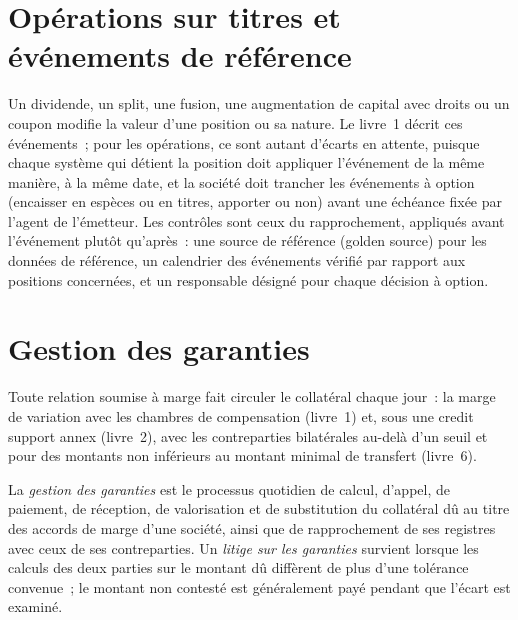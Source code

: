 \section{Opérations sur titres et événements de référence}

Un dividende, un split, une fusion, une augmentation de capital avec droits ou un coupon modifie la valeur d'une position ou sa nature. Le livre~1 décrit ces événements~; pour
les opérations, ce sont autant d'écarts en attente, puisque chaque système qui détient la position doit appliquer l'événement de la même manière, à la même date, et
la société doit trancher les événements à option (encaisser en espèces ou en titres, apporter ou non) avant une échéance fixée par l'agent de l'émetteur. Les contrôles sont
ceux du rapprochement, appliqués avant l'événement plutôt qu'après~: une source de référence (golden source) pour les données de référence, un calendrier des événements vérifié
par rapport aux positions concernées, et un responsable désigné pour chaque décision à option.

\section{Gestion des garanties}

Toute relation soumise à marge fait circuler le collatéral chaque jour~: la marge de variation avec les chambres de compensation (livre~1) et, sous une credit support annex (livre~2),
avec les contreparties bilatérales au-delà d'un seuil et pour des montants non inférieurs au montant minimal de transfert (livre~6).

\begin{definition}\label{def:fm:operations:collateral}
La \emph{gestion des garanties} est le processus quotidien de calcul, d'appel, de paiement, de réception, de valorisation et de substitution
du collatéral dû au titre des accords de marge d'une société, ainsi que de rapprochement de ses registres avec ceux de ses contreparties. Un \emph{litige sur les
garanties} survient lorsque les calculs des deux parties sur le montant dû diffèrent de plus d'une tolérance convenue~; le
montant non contesté est généralement payé pendant que l'écart est examiné.
\end{definition}

